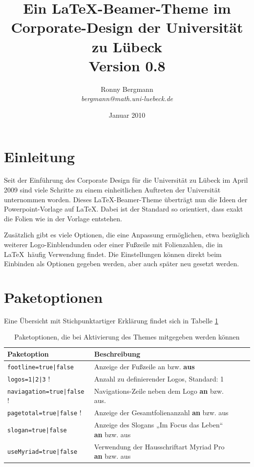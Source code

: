 \documentclass[a4paper,DIV=calc, oneside]{scrartcl}
\newcommand{\missing}{{\color{red}!}}
\begin{document}
	\thispagestyle{empty}
\title{Ein \LaTeX-Beamer-Theme im Corporate-Design der Universität zu Lübeck\\{\large\normalfont Version 0.8}}
\author{Ronny Bergmann\\\emph{bergmann@math.uni-luebeck.de}}
\date{Januar 2010}
\maketitle
\section{Einleitung}
Seit der Einführung des Corporate Design für die Universität zu Lübeck im April 2009 sind viele Schritte zu einem einheitlichen Auftreten der Universität unternommen worden. Dieses \LaTeX-Beamer-Theme überträgt nun die Ideen der
Powerpoint-Vorlage auf \LaTeX. Dabei ist der Standard so orientiert, dass exakt die Folien wie in der Vorlage entstehen.

Zusätzlich gibt es viele Optionen, die eine Anpassung ermöglichen, etwa bezüglich weiterer Logo-Einblendunden oder
einer Fußzeile mit Folienzahlen, die in \LaTeX\ häufig Verwendung findet. Die Einstellungen können direkt beim Einbinden als Optionen gegeben werden, aber auch später neu gesetzt werden.

\section{Paketoptionen}
Eine Übersicht mit Stichpunktartiger Erklärung findet sich in Tabelle \ref{tab:Paketoptionen}
\begin{table}
	\begin{tabular}{llll}
		\toprule
		\textbf{Paketoption} & \textbf{Beschreibung}\\\midrule
		\lstinline!footline=true|false! & Anzeige der Fußzeile an bzw. \textbf{aus}\\
		\lstinline!logos=1|2|3! \missing & Anzahl zu definierender Logos, Standard: 1\\
		\lstinline!naviagation=true|false! \missing & Navigations-Zeile neben dem Logo \textbf{an} bzw. aus.\\
		\lstinline!pagetotal=true|false! \missing & Anzeige der Gesamtfolienanzahl \textbf{an} bzw. aus\\
		\lstinline!slogan=true|false! & Anzeige des Slogans „Im Focus das Leben“ \textbf{an} bzw. aus\\
		\lstinline!useMyriad=true|false! & Verwendung der Hausschriftart Myriad Pro \textbf{an} bzw. aus\\\bottomrule
	\end{tabular}
	\caption{Paketoptionen, die bei Aktivierung des Themes mitgegeben werden können}
	\label{tab:Paketoptionen}
\end{table}
\end{document}
